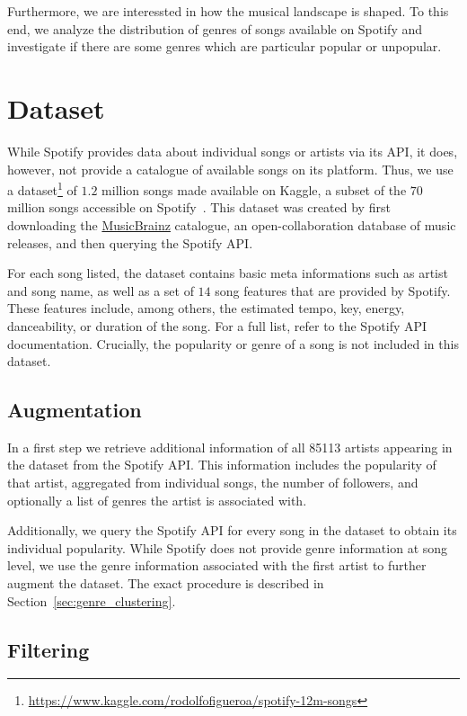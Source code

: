 \documentclass{article}
\begin{document}
Furthermore, we are interessted in how the musical landscape is shaped. To this end, we analyze the distribution of genres of songs available on Spotify and investigate if there are some genres which are particular popular or unpopular.

\section{Dataset}
\label{sec:dataset}

While Spotify provides data about individual songs or artists via its API, it does, however, not provide a catalogue of available songs on its platform. Thus, we use a dataset\footnote{\url{https://www.kaggle.com/rodolfofigueroa/spotify-12m-songs}} of $1.2$ million songs made available on Kaggle, a subset of the $70$ million songs accessible on Spotify~\cite{ingham_2020}. This dataset was created by first downloading the \href{https://musicbrainz.org/}{MusicBrainz} catalogue, an open-collaboration database of music releases, and then querying the Spotify API. 

For each song listed, the dataset contains basic meta informations such as artist and song name, as well as a set of $14$ song features that are provided by Spotify. These features include, among others, the estimated tempo, key, energy, danceability, or duration of the song. For a full list, refer to the Spotify API documentation. Crucially, the popularity or genre of a song is not included in this dataset.

\subsection{Augmentation}
In a first step we retrieve additional information of all \num{85 113} artists appearing in the dataset from the Spotify API. This information includes the popularity of that artist, aggregated from individual songs, the number of followers, and optionally a list of genres the artist is associated with.

Additionally, we query the Spotify API for every song in the dataset to obtain its individual popularity. While Spotify does not provide genre information at song level, we use the genre information associated with the first artist to further augment the dataset. The exact procedure is described in Section~\ref{sec:genre_clustering}. 

\subsection{Filtering}
\end{document}

